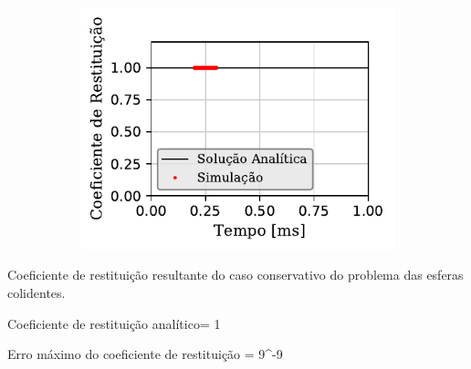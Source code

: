 \begin{figure}[htb!]
{\begin{subfigure}[t]{\smallresultsfigwidth}
			\includegraphics[scale=1]{images/colliding_spheres/conservative/coefficient_of_restitution_small.pdf}
			\caption{}
			\label{subfig:colliding_spheres:conservative:coefficient_of_restitution}
		\end{subfigure}
	}
	\label{fig:colliding_spheres:conservative:linear_momentum_force_kinetic_energy_and_coefficient_of_restitution}
	\sourceMe
\end{figure}

\begin{table}[h]
\centering
\caption{Coeficiente de restituição resultante do caso conservativo do problema das esferas colidentes.}
\label{tab:colliding_spheres:conservative:energy_and_coefficient_of_restitution}
\begin{parametersdesc}{0.8\textwidth}
	\item{Coeficiente de restituição analítico}{\coefficientOfRestitution = 1}{}
	\item{Erro máximo do coeficiente de restituição}{\maximumErrorOf{\coefficientOfRestitution} = 9^{-9}}{}
\end{parametersdesc}
\sourceMe 
\end{table}

